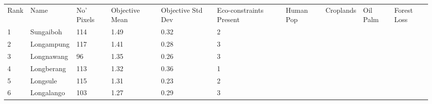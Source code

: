 \begin{table}[ht]
\centering
\begingroup\fontsize{9pt}{10pt}\selectfont
\begin{tabular}{C{0.05\textwidth}C{0.15\textwidth}C{0.08\textwidth}C{0.08\textwidth}C{0.08\textwidth}C{0.08\textwidth}C{0.08\textwidth}C{0.08\textwidth}C{0.08\textwidth}C{0.08\textwidth}}
 Rank & Name & No' Pixels & Objective Mean & Objective Std Dev & Eco-constraints  Present & Human Pop & Croplands & Oil Palm & Forest Loss \\ 
 {1} & Sungaiboh & 114 & \textcolor[HTML]{FFFFFF}{1.49} & \textcolor[HTML]{FFFFFF}{0.32} & \textcolor[HTML]{000000}{2} &  &  &  &  \\ 
  {2} & Longampung & 117 & \textcolor[HTML]{FFFFFF}{1.41} & \textcolor[HTML]{000000}{0.28} & \textcolor[HTML]{FFFFFF}{3} &  &  &  &  \\ 
  {3} & Longnawang &  96 & \textcolor[HTML]{FFFFFF}{1.35} & \textcolor[HTML]{000000}{0.26} & \textcolor[HTML]{FFFFFF}{3} &  &  &  &  \\ 
  {4} & Longberang & 113 & \textcolor[HTML]{FFFFFF}{1.32} & \textcolor[HTML]{FFFFFF}{0.36} & \textcolor[HTML]{000000}{1} &  &  &  &  \\ 
  {5} & Longsule & 115 & \textcolor[HTML]{FFFFFF}{1.31} & \textcolor[HTML]{000000}{0.23} & \textcolor[HTML]{000000}{2} &  &  &  &  \\ 
  {6} & Longalango & 103 & \textcolor[HTML]{000000}{1.27} & \textcolor[HTML]{000000}{0.29} & \textcolor[HTML]{FFFFFF}{3} &  &  &  &  \\ 

\end{tabular}
\end{table}
